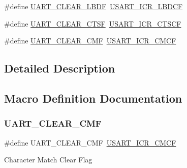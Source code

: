\begin{DoxyCompactItemize}
\item 
\#define \mbox{\hyperlink{group___u_a_r_t___i_t___c_l_e_a_r___flags_ga030414d9a93ad994156210644634b73c}{U\+A\+R\+T\+\_\+\+C\+L\+E\+A\+R\+\_\+\+L\+B\+DF}}~\mbox{\hyperlink{group___peripheral___registers___bits___definition_gaae7d1bc407d9e4168d7059043fe8e50f}{U\+S\+A\+R\+T\+\_\+\+I\+C\+R\+\_\+\+L\+B\+D\+CF}}
\item 
\#define \mbox{\hyperlink{group___u_a_r_t___i_t___c_l_e_a_r___flags_gabe0f3bc774ad0b9319732da3be8374cf}{U\+A\+R\+T\+\_\+\+C\+L\+E\+A\+R\+\_\+\+C\+T\+SF}}~\mbox{\hyperlink{group___peripheral___registers___bits___definition_ga8a630d4a5e4ce10ad6fdb9da47126f4f}{U\+S\+A\+R\+T\+\_\+\+I\+C\+R\+\_\+\+C\+T\+S\+CF}}
\item 
\#define \mbox{\hyperlink{group___u_a_r_t___i_t___c_l_e_a_r___flags_ga5815698abf54d69b752bd2c43c2d6ad3}{U\+A\+R\+T\+\_\+\+C\+L\+E\+A\+R\+\_\+\+C\+MF}}~\mbox{\hyperlink{group___peripheral___registers___bits___definition_ga5478360c2639166c4d645b64cbf371be}{U\+S\+A\+R\+T\+\_\+\+I\+C\+R\+\_\+\+C\+M\+CF}}
\end{DoxyCompactItemize}


\subsection{Detailed Description}


\subsection{Macro Definition Documentation}
\mbox{\label{group___u_a_r_t___i_t___c_l_e_a_r___flags_ga5815698abf54d69b752bd2c43c2d6ad3}} 
\subsubsection{\texorpdfstring{UART\_CLEAR\_CMF}{UART\_CLEAR\_CMF}}
{\footnotesize\ttfamily \#define U\+A\+R\+T\+\_\+\+C\+L\+E\+A\+R\+\_\+\+C\+MF~\mbox{\hyperlink{group___peripheral___registers___bits___definition_ga5478360c2639166c4d645b64cbf371be}{U\+S\+A\+R\+T\+\_\+\+I\+C\+R\+\_\+\+C\+M\+CF}}}

Character Match Clear Flag \mbox{\label{group___u_a_r_t___i_t___c_l_e_a_r___flags_gabe0f3bc774ad0b9319732da3be8374cf}} 
